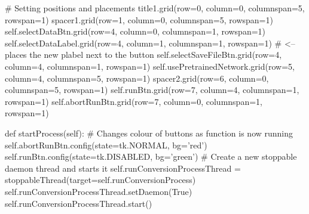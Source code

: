 \documentclass{report}
\begin{document}
\begin{python}
        # Setting positions and placements
        title1.grid(row=0, column=0, columnspan=5, rowspan=1)
        spacer1.grid(row=1, column=0, columnspan=5, rowspan=1)
        self.selectDataBtn.grid(row=4, column=0, columnspan=1, rowspan=1)
        self.selectDataLabel.grid(row=4, column=1, columnspan=1, rowspan=1)  # <-- places the new plabel next to the button
        self.selectSaveFileBtn.grid(row=4, column=4, columnspan=1, rowspan=1)
        self.usePretrainedNetwork.grid(row=5, column=4, columnspan=5, rowspan=1)
        spacer2.grid(row=6, column=0, columnspan=5, rowspan=1)
        self.runBtn.grid(row=7, column=4, columnspan=1, rowspan=1)
        self.abortRunBtn.grid(row=7, column=0, columnspan=1, rowspan=1)

    def startProcess(self):
        # Changes colour of buttons as function is now running
        self.abortRunBtn.config(state=tk.NORMAL, bg='red')
        self.runBtn.config(state=tk.DISABLED, bg='green')
        # Create a new stoppable daemon thread and starts it
        self.runConversionProcessThread = stoppableThread(target=self.runConversionProcess)
        self.runConversionProcessThread.setDaemon(True)
        self.runConversionProcessThread.start()


\end{python}
\end{document}
